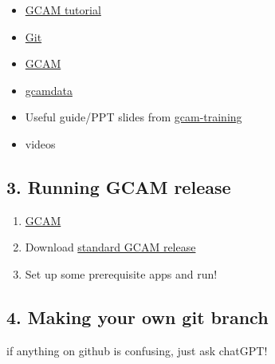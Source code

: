 \documentclass[
  letterpaper,
  DIV=11,
  numbers=noendperiod]{scrartcl}
\providecommand{\tightlist}{%
  \setlength{\itemsep}{0pt}\setlength{\parskip}{0pt}}\usepackage{longtable,booktabs,array}
\begin{document}
\begin{itemize}
\tightlist
\item
  \href{https://jgcri.github.io/gcam_training/gcam.html}{GCAM tutorial}
\item
  \href{https://www.jrebel.com/blog/git-cheat-sheet}{Git}
\item
  \href{https://jgcri.github.io/gcam-doc/user-guide.html}{GCAM}
\item
  \href{https://jgcri.github.io/gcamdata/articles/getting-started/getting-started.html}{gcamdata}
\item
  Useful guide/PPT slides from
  \href{https://github.com/JGCRI/gcam_training/tree/main/presentations}{gcam-training}
\item
  videos
\end{itemize}

\hypertarget{running-gcam-release}{%
\subsection{3. Running GCAM release}\label{running-gcam-release}}

\begin{enumerate}
\def\labelenumi{\arabic{enumi}.}
\tightlist
\item
  \href{https://jgcri.github.io/gcam-doc/user-guide.html}{GCAM}
\item
  Download
  \href{https://github.com/JGCRI/gcam-core/releases/tag/gcam-v7.0}{standard
  GCAM release}
\item
  Set up some prerequisite apps and run!
\end{enumerate}

\hypertarget{making-your-own-git-branch}{%
\subsection{4. Making your own git
branch}\label{making-your-own-git-branch}}

\begin{tcolorbox}[enhanced jigsaw, leftrule=.75mm, opacitybacktitle=0.6, arc=.35mm, breakable, opacityback=0, left=2mm, coltitle=black, toptitle=1mm, toprule=.15mm, bottomtitle=1mm, bottomrule=.15mm, titlerule=0mm, title=\textcolor{quarto-callout-note-color}{\faInfo}\hspace{0.5em}{Note}, rightrule=.15mm, colback=white, colbacktitle=quarto-callout-note-color!10!white, colframe=quarto-callout-note-color-frame]
if anything on github is confusing, just ask chatGPT!
\end{tcolorbox}
\end{document}
